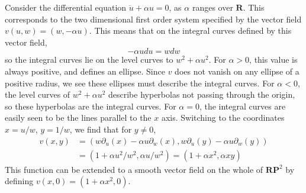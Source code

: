 \begin{example}
    Consider the differential equation $\ddot{u} + \alpha u = 0$, as $\alpha$ ranges over $\mathbf{R}$. This corresponds to the two dimensional first order system specified by the vector field $v(u,w) = (w, -\alpha u)$. This means that on the integral curves defined by this vector field,
    \[ - \alpha u du = w dw \]
    so the integral curves lie on the level curves to $w^2 + \alpha u^2$. For $\alpha > 0$, this value is always positive, and defines an ellipse. Since $v$ does not vanish on any ellipse of a positive radius, we see these ellipses must describe the integral curves. For $\alpha < 0$, the level curves of $w^2 + \alpha u^2$ describe hyperbolas not passing through the origin, so these hyperbolas are the integral curves. For $\alpha = 0$, the integral curves are easily seen to be the lines parallel to the $x$ axis. Switching to the coordinates $x = u/w$, $y = 1/w$, we find that for $y \neq 0$,
    \begin{align*}
        v(x,y) &= (w \partial_u(x) - \alpha u \partial_w(x), w \partial_u(y) - \alpha u \partial_w(y))\\
        &= (1 + \alpha u^2/w^2, \alpha u/w^2) = (1 + \alpha x^2, \alpha xy)
    \end{align*}
    This function can be extended to a smooth vector field on the whole of $\mathbf{RP}^2$ by defining $v(x,0) = (1 + \alpha x^2,0)$.
\end{example}

\begin{thebibliography}{9}


\end{thebibliography}

